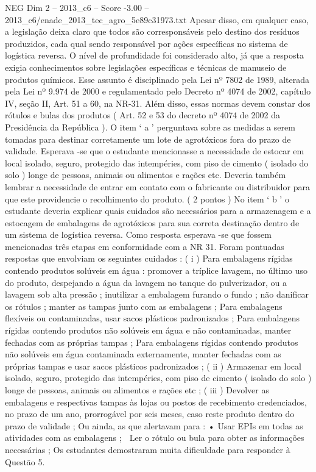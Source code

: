 \begin{textsample}{NEG Dim 2 – 2013\_c6 – Score -3.00 – 2013\_c6/enade\_2013\_tec\_agro\_5e89c31973.txt}
Apesar disso, em qualquer caso, a legislação deixa claro que todos são corresponsáveis pelo destino dos resíduos produzidos, cada qual sendo responsável por ações específicas no sistema de logística reversa.
O nível de profundidade foi considerado alto, já que a resposta exigia conhecimentos sobre legislações específicas e técnicas de manuseio de produtos químicos.
Esse assunto é disciplinado pela Lei nº 7802 de 1989, alterada pela Lei nº 9.974 de 2000 e regulamentado pelo Decreto nº 4074 de 2002, capítulo IV, seção II, Art. 51 a 60, na NR-31.
Além disso, essas normas devem constar dos rótulos e bulas dos produtos ( Art. 52 e 53 do decreto nº 4074 de 2002 da Presidência da República ).
O item ‘ a ’ perguntava sobre as medidas a serem tomadas para destinar corretamente um lote de agrotóxicos fora do prazo de validade.
Esperava -se que o estudante mencionasse a necessidade de estocar em local isolado, seguro, protegido das intempéries, com piso de cimento ( isolado do solo ) longe de pessoas, animais ou alimentos e rações etc.
Deveria também lembrar a necessidade de entrar em contato com o fabricante ou distribuidor para que este providencie o recolhimento do produto. ( 2 pontos ) No item ‘ b ’ o estudante deveria explicar quais cuidados são necessários para a armazenagem e a estocagem de embalagens de agrotóxicos para sua correta destinação dentro de um sistema de logística reversa.
Como resposta esperava -se que fossem mencionadas três etapas em conformidade com a NR 31.
Foram pontuadas respostas que envolviam os seguintes cuidados : ( i ) Para embalagens rígidas contendo produtos solúveis em água : promover a tríplice lavagem, no último uso do produto, despejando a água da lavagem no tanque do pulverizador, ou a lavagem sob alta pressão ; inutilizar a embalagem furando o fundo ; não danificar os rótulos ; manter as tampas junto com as embalagens ; Para embalagens flexíveis ou contaminadas, usar sacos plásticos padronizados ; Para embalagens rígidas contendo produtos não solúveis em água e não contaminadas, manter fechadas com as próprias tampas ; Para embalagens rígidas contendo produtos não solúveis em água contaminada externamente, manter fechadas com as próprias tampas e usar sacos plásticos padronizados ; ( ii ) Armazenar em local isolado, seguro, protegido das intempéries, com piso de cimento ( isolado do solo ) longe de pessoas, animais ou alimentos e rações etc ; ( iii ) Devolver as embalagens e respectivas tampas às lojas ou postos de recebimento credenciados, no prazo de um ano, prorrogável por seis meses, caso reste produto dentro do prazo de validade ; Ou ainda, as que alertavam para : • Usar EPIs em todas as atividades com as embalagens ;  Ler o rótulo ou bula para obter as informações necessárias ; Os estudantes demostraram muita dificuldade para responder à Questão 5.

\end{textsample}
